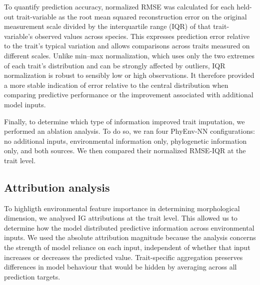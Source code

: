 \documentclass[preprint,12pt,authoryear]{elsarticle}
\newcommand{\awesomeModel}{PhyEnv-NN }
\begin{document}
To quantify prediction accuracy, normalized RMSE was calculated for each held-out trait-variable as the root mean squared reconstruction error on the original measurement scale divided by the interquartile range (IQR) of that trait-variable’s observed values across species. This expresses prediction error relative to the trait’s typical variation and allows comparisons across traits measured on different scales. Unlike min–max normalization, which uses only the two extremes of each trait's distribution and can be strongly affected by outliers, IQR normalization is robust to sensibly low or high observations. It therefore provided a more stable indication of error relative to the central distribution when comparing predictive performance or the improvement associated with additional model inputs.

Finally, to determine which type of information improved trait imputation, we performed an ablation analysis. To do so, we ran four \awesomeModel configurations: no additional inputs, environmental information only, phylogenetic information only, and both sources. We then compared their normalized RMSE-IQR at the trait level.


\subsection{Attribution analysis}

To highligth environmental feature importance in determining morphological dimension, we analysed IG attributions at the trait level. This allowed us to determine how the model distributed predictive information across environmental inputs. We used the absolute attribution magnitude because the analysis concerns the strength of model reliance on each input, independent of whether that input increases or decreases the predicted value. Trait-specific aggregation preserves differences in model behaviour that would be hidden by averaging across all prediction targets.
\end{document}
